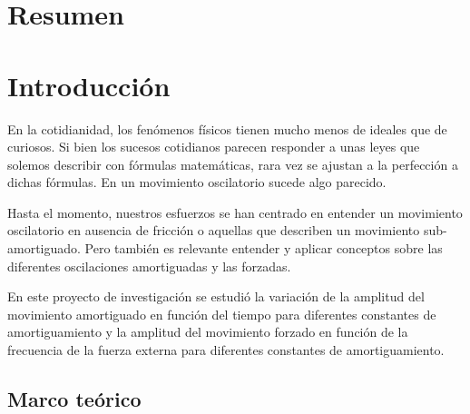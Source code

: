\documentclass[spanish,notitlepage,letterpaper, 12pt]{article}
\begin{document}

\tableofcontents

\newpage

\section{Resumen}
\lipsum[1]
\section{Introducción}
En la cotidianidad, los fenómenos físicos tienen mucho menos de ideales que de curiosos.
Si bien los sucesos cotidianos parecen responder a unas leyes que solemos describir con fórmulas matemáticas, rara vez se ajustan a la perfección a dichas fórmulas. En un movimiento oscilatorio sucede algo parecido.\par
\bigskip
Hasta el momento, nuestros esfuerzos se han centrado en entender un movimiento oscilatorio en ausencia de fricción o aquellas que describen un movimiento sub-amortiguado. Pero también es relevante entender y aplicar conceptos sobre las diferentes oscilaciones amortiguadas y las forzadas.\par
\bigskip
En este proyecto de investigación se estudió la variación de la amplitud del
movimiento amortiguado en función del tiempo para diferentes constantes de
amortiguamiento y la amplitud del movimiento forzado en función de la frecuencia de la
fuerza externa para diferentes constantes de amortiguamiento.
\subsection{Marco teórico} \label{I.MT}
\end{document}
